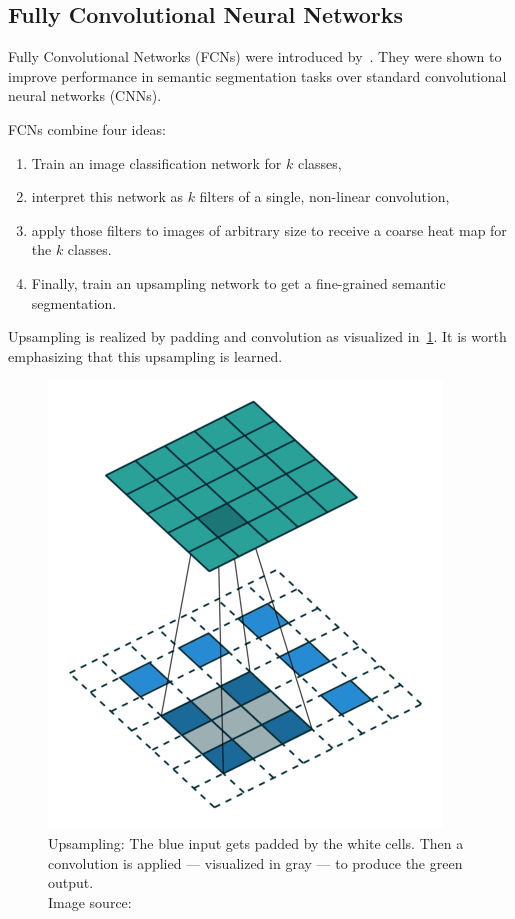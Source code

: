 \subsection{Fully Convolutional Neural Networks}

Fully Convolutional Networks (FCNs) were introduced by~\cite{long2015fully}.
They were shown to improve performance in semantic segmentation tasks over
standard convolutional neural networks (CNNs).

FCNs combine four ideas:

\begin{enumerate}
    \item Train an image classification network for $k$ classes,
    \item interpret this network as $k$ filters of a single, non-linear
          convolution,
    \item apply those filters to images of arbitrary size to receive a
          coarse heat map for the $k$ classes.
    \item Finally, train an upsampling network to get a fine-grained semantic
          segmentation.
\end{enumerate}

Upsampling is realized by padding and convolution as visualized
in~\cref{fig:upsampling}. It is worth emphasizing that this upsampling is
learned.

\begin{figure}[ht]
    \centering
    \includegraphics[width=\linewidth]{images/upsampling2-16.png}
    \caption{Upsampling: The blue input gets padded by the white cells. Then
             a convolution is applied --- visualized in gray --- to produce
             the green output.\\
             Image source:~\cite{vdumoulin2016}}
    \label{fig:upsampling}
\end{figure}

